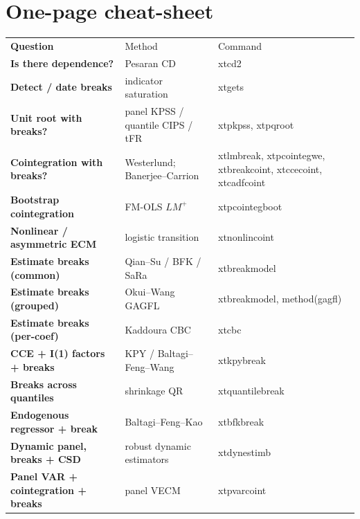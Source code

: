 \documentclass[11pt,a4paper]{article}
\theoremstyle{definition}
\begin{document}
\section{One-page cheat-sheet}
\begin{center}
\begin{tabular}{@{}>{\bfseries}p{3.5cm} p{5.0cm} >{\ttfamily}p{4.6cm}@{}}
\rowcolor{cgrape}\color{white}Question & \color{white}Method & \color{white}Command\\
Is there dependence? & Pesaran CD & xtcd2\\
Detect / date breaks & indicator saturation & xtgets\\
Unit root with breaks? & panel KPSS / quantile CIPS / tFR & xtpkpss, xtpqroot\\
Cointegration with breaks? & Westerlund; Banerjee--Carrion & xtlmbreak, xtpcointegwe, xtbreakcoint, xtccecoint, xtcadfcoint\\
Bootstrap cointegration & FM-OLS $LM^+$ & xtpcointegboot\\
Nonlinear / asymmetric ECM & logistic transition & xtnonlincoint\\
Estimate breaks (common) & Qian--Su / BFK / SaRa & xtbreakmodel\\
Estimate breaks (grouped) & Okui--Wang GAGFL & xtbreakmodel, method(gagfl)\\
Estimate breaks (per-coef) & Kaddoura CBC & xtcbc\\
CCE + I(1) factors + breaks & KPY / Baltagi--Feng--Wang & xtkpybreak\\
Breaks across quantiles & shrinkage QR & xtquantilebreak\\
Endogenous regressor + break & Baltagi--Feng--Kao & xtbfkbreak\\
Dynamic panel, breaks + CSD & robust dynamic estimators & xtdynestimb\\
Panel VAR + cointegration + breaks & panel VECM & xtpvarcoint\\
\end{tabular}
\end{center}

\end{document}
